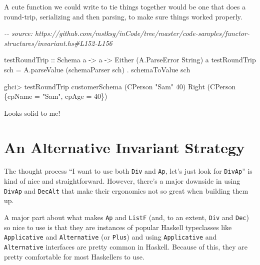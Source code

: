 \documentclass[]{article}
\newenvironment{Shaded}{}{}
\newcommand{\CommentTok}[1]{\textcolor[rgb]{0.38,0.63,0.69}{\textit{#1}}}
\newcommand{\DataTypeTok}[1]{\textcolor[rgb]{0.56,0.13,0.00}{#1}}
\newcommand{\DecValTok}[1]{\textcolor[rgb]{0.25,0.63,0.44}{#1}}
\newcommand{\NormalTok}[1]{#1}
\newcommand{\OperatorTok}[1]{\textcolor[rgb]{0.40,0.40,0.40}{#1}}
\newcommand{\OtherTok}[1]{\textcolor[rgb]{0.00,0.44,0.13}{#1}}
\newcommand{\StringTok}[1]{\textcolor[rgb]{0.25,0.44,0.63}{#1}}
\begin{document}
A cute function we could write to tie things together would be one that does a
round-trip, serializing and then parsing, to make sure things worked properly.

\begin{Shaded}
\begin{Highlighting}[]
\CommentTok{{-}{-} source: https://github.com/mstksg/inCode/tree/master/code{-}samples/functor{-}structures/invariant.hs\#L152{-}L156}

\NormalTok{testRoundTrip}
\OtherTok{    ::} \DataTypeTok{Schema}\NormalTok{ a}
    \OtherTok{{-}>}\NormalTok{ a}
    \OtherTok{{-}>} \DataTypeTok{Either}\NormalTok{ (}\DataTypeTok{A.ParseError} \DataTypeTok{String}\NormalTok{) a}
\NormalTok{testRoundTrip sch }\OtherTok{=}\NormalTok{ A.parseValue (schemaParser sch) }\OperatorTok{.}\NormalTok{ schemaToValue sch}
\end{Highlighting}
\end{Shaded}

\begin{Shaded}
\begin{Highlighting}[]
\NormalTok{ghci}\OperatorTok{>}\NormalTok{ testRoundTrip customerSchema (}\DataTypeTok{CPerson} \StringTok{"Sam"} \DecValTok{40}\NormalTok{)}
\DataTypeTok{Right}\NormalTok{ (}\DataTypeTok{CPerson}\NormalTok{ \{cpName }\OtherTok{=} \StringTok{"Sam"}\NormalTok{, cpAge }\OtherTok{=} \DecValTok{40}\NormalTok{\})}
\end{Highlighting}
\end{Shaded}

Looks solid to me!

\hypertarget{an-alternative-invariant-strategy}{%
\section{An Alternative Invariant
Strategy}\label{an-alternative-invariant-strategy}}

The thought process ``I want to use both \texttt{Div} and \texttt{Ap}, let's
just look for \texttt{DivAp}'' is kind of nice and straightforward. However,
there's a major downside in using \texttt{DivAp} and \texttt{DecAlt} that make
their ergonomics not so great when building them up.

A major part about what makes \texttt{Ap} and \texttt{ListF} (and, to an extent,
\texttt{Div} and \texttt{Dec}) so nice to use is that they are instances of
popular Haskell typeclasses like \texttt{Applicative} and \texttt{Alternative}
(or \texttt{Plus}) and using \texttt{Applicative} and \texttt{Alternative}
interfaces are pretty common in Haskell. Because of this, they are pretty
comfortable for most Haskellers to use.
\end{document}
